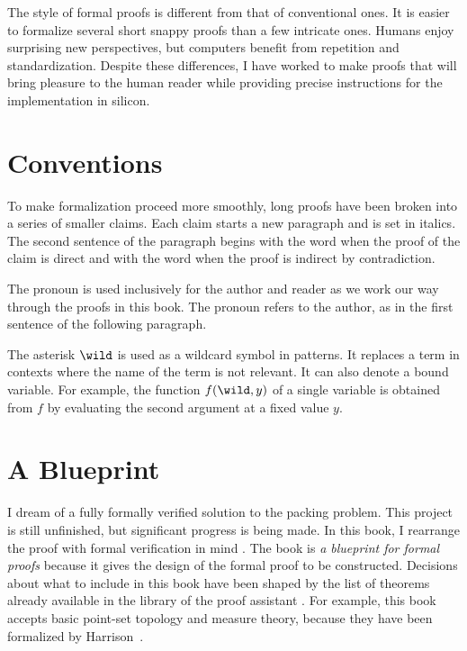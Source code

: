 The style of formal proofs is different from that of conventional
ones.  It is easier to formalize several short snappy proofs
than a few intricate ones.  Humans enjoy surprising new perspectives,
but computers benefit from repetition and standardization.  Despite
these differences, I have worked to make proofs that will bring
pleasure to the human reader while providing precise instructions for
the implementation in silicon.

\section*{Conventions}

To make formalization proceed more smoothly, long proofs have been
broken into a series of smaller claims.  Each claim starts a new paragraph
and is set in italics.  The second sentence of the paragraph begins with
the word  when the proof of the claim is direct and with
the word  when the proof is indirect by contradiction.

The pronoun  is used inclusively for the author and reader as
we work our way through the proofs in this book.  The pronoun  
refers to the author, as in the first sentence of the following paragraph.

The asterisk $\wild$ is used as a wildcard symbol in patterns.  It
replaces a term in contexts where the name of the term is not
relevant.  It can also denote a bound variable.  For example, the
function $f(\wild,y)$ of a single variable is obtained from $f$ by
evaluating the second argument at a fixed value $y$.

\section*{A Blueprint}

I dream of a fully formally verified solution to the
packing problem.  This project is still unfinished, but significant
progress is being made.  In this book, I rearrange the proof with
formal verification in mind .  The book is {\it a blueprint for formal
  proofs} because it gives the design of the formal proof to be
constructed.  Decisions about what to include in this book have been
shaped by the list of theorems already available in the library of the
proof assistant .  For example, this book accepts basic
point-set topology and measure theory, because they have been formalized by
Harrison~\cite{HOLL}.


